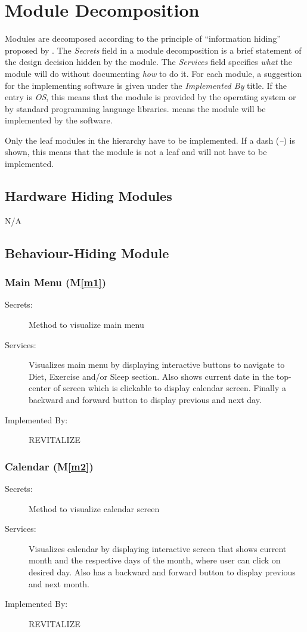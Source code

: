 \documentclass[12pt, titlepage]{article}
\newcommand{\mref}[1]{M\ref{#1}}
\begin{document}
\section{Module Decomposition} \label{SecMD}

Modules are decomposed according to the principle of ``information hiding''
proposed by \citet{ParnasEtAl1984}. The \emph{Secrets} field in a module
decomposition is a brief statement of the design decision hidden by the
module. The \emph{Services} field specifies \emph{what} the module will do
without documenting \emph{how} to do it. For each module, a suggestion for the
implementing software is given under the \emph{Implemented By} title. If the
entry is \emph{OS}, this means that the module is provided by the operating
system or by standard programming language libraries.  \emph{\progname{}} means the
module will be implemented by the \progname{} software.

Only the leaf modules in the hierarchy have to be implemented. If a dash
(\emph{--}) is shown, this means that the module is not a leaf and will not have
to be implemented.

\subsection{Hardware Hiding Modules }
N/A

\subsection{Behaviour-Hiding Module}

\subsubsection{Main Menu (\mref{m1})}
\begin{description}
	\item[Secrets:]Method to visualize main menu
	\item[Services:]Visualizes main menu by displaying interactive buttons to navigate to Diet, Exercise and/or Sleep section. Also shows current date in the top-center of screen which is clickable to display calendar screen. Finally a backward and forward button to display previous and next day.
	\item[Implemented By:] REVITALIZE
\end{description}

\subsubsection{Calendar (\mref{m2})}
\begin{description}
	\item[Secrets:]Method to visualize calendar screen
	\item[Services:]Visualizes calendar by displaying interactive screen that shows current month and the respective days of the month, where user can click on desired day. Also has a backward and forward button to display previous and next month.
	\item[Implemented By:] REVITALIZE
\end{description}
\end{document}
